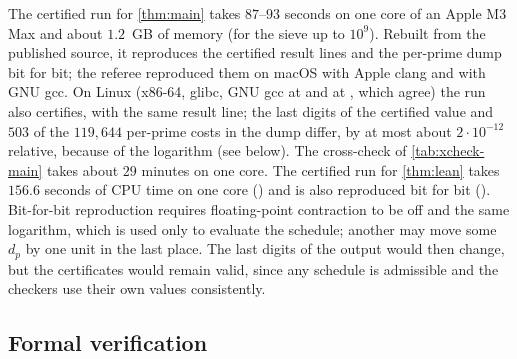 The certified run for \cref{thm:main} takes $87$--$93$ seconds on one core of an Apple M3 Max and about $1.2$~GB of
memory (for the sieve up to $10^9$). Rebuilt from the published source, it reproduces the certified result lines and
the per-prime dump bit for bit; the referee reproduced them on macOS with Apple clang and with GNU gcc. On Linux
(x86-64, glibc, GNU gcc at  and at , which agree) the run also certifies, with the same result
line; the last digits of the certified value and $503$ of the $119{,}644$ per-prime costs in the dump differ, by at
most about $2\cdot10^{-12}$ relative, because of the logarithm (see below). The cross-check of
\cref{tab:xcheck-main} takes about $29$ minutes on one core. The certified run for \cref{thm:lean} takes $156.6$
seconds of CPU time on one core () and is also reproduced bit for bit
(). Bit-for-bit reproduction requires floating-point contraction to be off and the same
 logarithm, which is used only to evaluate the schedule; another  may move some $d_p$ by one
unit in the last place. The last digits of the output would then change, but the certificates would remain valid,
since any schedule is admissible and the checkers use their own values consistently.

\subsection{Formal verification}\label{sec:lean}

